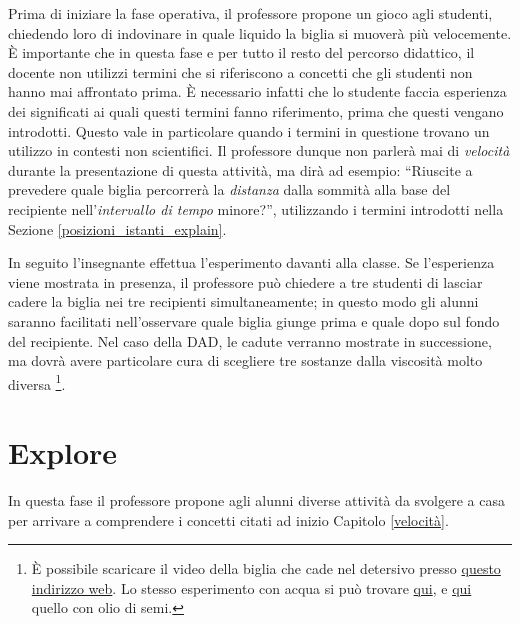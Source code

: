 \documentclass{report} \usepackage[T1]{fontenc} \usepackage[italian]{babel}
\begin{document}
Prima di iniziare la fase operativa, il professore propone un gioco
agli studenti, chiedendo loro di indovinare in quale liquido la biglia
si muoverà più velocemente. \`E importante che in questa fase e per
tutto il resto del percorso didattico, il docente non utilizzi termini
che si riferiscono a concetti che gli studenti non hanno mai
affrontato prima. \`E necessario infatti che lo studente faccia
esperienza dei significati ai quali questi termini fanno riferimento,
prima che questi vengano introdotti. Questo vale in particolare
quando i termini in questione trovano un utilizzo in contesti
non scientifici\cite{arons1997teaching}.
Il professore dunque non parlerà mai di \emph{velocità} durante
la presentazione di questa attività, ma dirà ad esempio:
``Riuscite a prevedere quale biglia percorrerà la \emph{distanza}
dalla sommità alla base del recipiente nell'\emph{intervallo di tempo}
minore?'', utilizzando i termini introdotti nella Sezione
\ref{posizioni_istanti_explain}.

In seguito l'insegnante effettua l'esperimento davanti alla classe.
Se l'esperienza viene mostrata in presenza, il professore
può chiedere a tre studenti di lasciar cadere la biglia nei tre recipienti
simultaneamente; in questo modo gli alunni saranno facilitati
nell'osservare quale biglia giunge prima e quale dopo sul fondo del
recipiente. Nel caso della DAD, le cadute verranno mostrate in successione,
 ma dovrà avere particolare cura di scegliere tre sostanze dalla
viscosità molto diversa
\footnote{
          \`E possibile scaricare il video della biglia che
          cade nel detersivo presso
          \textcolor{blue}{\href{https://github.com/savaroskij/PED1/blob/master/progetto_finale/media/video/velocity_engage_videos/detersivo.mp4?raw=true}{questo indirizzo web}}.
          Lo stesso esperimento con acqua si può trovare
          \textcolor{blue}{\href{https://github.com/savaroskij/PED1/blob/master/progetto_finale/media/video/velocity_engage_videos/acqua.mp4?raw=true}{qui}},
          e
          \textcolor{blue}{\href{https://github.com/savaroskij/PED1/blob/master/progetto_finale/media/video/velocity_engage_videos/olio_semi.mp4?raw=true}{qui}}
          quello con olio di semi.
         }.

\section{Explore}
In questa fase il professore propone agli alunni diverse attività da svolgere a
casa per arrivare a comprendere i concetti citati ad inizio Capitolo
\ref{velocità}.
\end{document}
